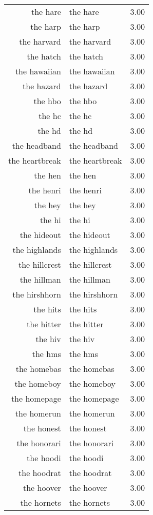 \begin{table}[ht]
\begin{tabular}{rlr}
  the hare & the hare & 3.00 \\ 
  the harp & the harp & 3.00 \\ 
  the harvard & the harvard & 3.00 \\ 
  the hatch & the hatch & 3.00 \\ 
  the hawaiian & the hawaiian & 3.00 \\ 
  the hazard & the hazard & 3.00 \\ 
  the hbo & the hbo & 3.00 \\ 
  the hc & the hc & 3.00 \\ 
  the hd & the hd & 3.00 \\ 
  the headband & the headband & 3.00 \\ 
  the heartbreak & the heartbreak & 3.00 \\ 
  the hen & the hen & 3.00 \\ 
  the henri & the henri & 3.00 \\ 
  the hey & the hey & 3.00 \\ 
  the hi & the hi & 3.00 \\ 
  the hideout & the hideout & 3.00 \\ 
  the highlands & the highlands & 3.00 \\ 
  the hillcrest & the hillcrest & 3.00 \\ 
  the hillman & the hillman & 3.00 \\ 
  the hirshhorn & the hirshhorn & 3.00 \\ 
  the hits & the hits & 3.00 \\ 
  the hitter & the hitter & 3.00 \\ 
  the hiv & the hiv & 3.00 \\ 
  the hms & the hms & 3.00 \\ 
  the homebas & the homebas & 3.00 \\ 
  the homeboy & the homeboy & 3.00 \\ 
  the homepage & the homepage & 3.00 \\ 
  the homerun & the homerun & 3.00 \\ 
  the honest & the honest & 3.00 \\ 
  the honorari & the honorari & 3.00 \\ 
  the hoodi & the hoodi & 3.00 \\ 
  the hoodrat & the hoodrat & 3.00 \\ 
  the hoover & the hoover & 3.00 \\ 
  the hornets & the hornets & 3.00 \\ 

\end{tabular}
\end{table}
